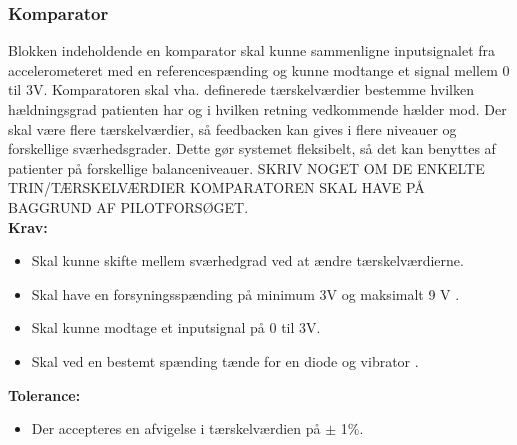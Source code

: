 \subsubsection{Komparator} 
Blokken indeholdende en komparator skal kunne sammenligne inputsignalet fra accelerometeret med en referencespænding og kunne modtange et signal mellem 0 til 3V. Komparatoren skal vha. definerede tærskelværdier bestemme hvilken hældningsgrad patienten har og i hvilken retning vedkommende hælder mod. Der skal være flere tærskelværdier, så feedbacken kan gives i flere niveauer og forskellige sværhedsgrader. Dette gør systemet fleksibelt, så det kan benyttes af patienter på forskellige balanceniveauer.
SKRIV NOGET OM DE ENKELTE TRIN/TÆRSKELVÆRDIER KOMPARATOREN SKAL HAVE PÅ BAGGRUND AF PILOTFORSØGET. \\
\textbf{Krav:}
\begin{itemize}
\item Skal kunne skifte mellem sværhedgrad ved at ændre tærskelværdierne.
\item Skal have en forsyningsspænding på minimum 3V og maksimalt 9 V .
\item Skal kunne modtage et inputsignal på 0 til 3V.
\item Skal ved en bestemt spænding  tænde for en diode og vibrator .
\end{itemize}
\textbf{Tolerance:}
\begin{itemize}
\item Der accepteres en afvigelse i tærskelværdien på $\pm$ 1\%.
\end{itemize}
